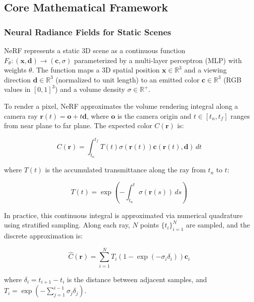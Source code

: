 \documentclass[12pt,a4paper,oneside]{report}
\begin{document}
\subsection{Core Mathematical Framework}
\label{subsec:core_mathematical_framework}

\subsubsection{Neural Radiance Fields for Static Scenes}
\label{subsubsec:neural_radiance_fields_for_static_scenes}

NeRF represents a static 3D scene as a continuous function $F_\theta: (\mathbf{x}, \mathbf{d}) \rightarrow (\mathbf{c}, \sigma)$ parameterized by a multi-layer perceptron (MLP) with weights $\theta$. The function maps a 3D spatial position $\mathbf{x} \in \mathbb{R}^3$ and a viewing direction $\mathbf{d} \in \mathbb{R}^3$ (normalized to unit length) to an emitted color $\mathbf{c} \in \mathbb{R}^3$ (RGB values in $[0,1]^3$) and a volume density $\sigma \in \mathbb{R}^+$.

To render a pixel, NeRF approximates the volume rendering integral along a camera ray $\mathbf{r}(t) = \mathbf{o} + t\mathbf{d}$, where $\mathbf{o}$ is the camera origin and $t \in [t_n, t_f]$ ranges from near plane to far plane. The expected color $C(\mathbf{r})$ is:

\begin{equation}
C(\mathbf{r}) = \int_{t_n}^{t_f} T(t) \sigma(\mathbf{r}(t)) \mathbf{c}(\mathbf{r}(t), \mathbf{d}) \, dt
\end{equation}

where $T(t)$ is the accumulated transmittance along the ray from $t_n$ to $t$:

\begin{equation}
T(t) = \exp\left(-\int_{t_n}^{t} \sigma(\mathbf{r}(s)) \, ds\right)
\end{equation}

In practice, this continuous integral is approximated via numerical quadrature using stratified sampling. Along each ray, $N$ points $\{t_i\}_{i=1}^N$ are sampled, and the discrete approximation is:

\begin{equation}
\hat{C}(\mathbf{r}) = \sum_{i=1}^{N} T_i (1 - \exp(-\sigma_i \delta_i)) \mathbf{c}_i
\end{equation}

where $\delta_i = t_{i+1} - t_i$ is the distance between adjacent samples, and $T_i = \exp\left(-\sum_{j=1}^{i-1} \sigma_j \delta_j\right)$.
\end{document}
